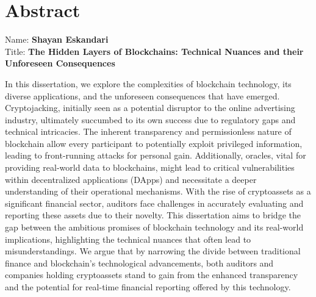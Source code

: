 
\chapter*{Abstract}

Name: 	\tab \textbf{Shayan Eskandari} \\
Title: 	\tab \textbf{The Hidden Layers of Blockchains: Technical Nuances and their Unforeseen Consequences}

In this dissertation, we explore the complexities of blockchain technology, its diverse applications, and the unforeseen consequences that have emerged. Cryptojacking, initially seen as a potential disruptor to the online advertising industry, ultimately succumbed to its own success due to regulatory gaps and technical intricacies. The inherent transparency and permissionless nature of blockchain allow every participant to potentially exploit privileged information, leading to front-running attacks for personal gain. Additionally, oracles, vital for providing real-world data to blockchains, might lead to critical vulnerabilities within decentralized applications (DApps) and necessitate a deeper understanding of their operational mechanisms. With the rise of cryptoassets as a significant financial sector, auditors face challenges in accurately evaluating and reporting these assets due to their novelty. This dissertation aims to bridge the gap between the ambitious promises of blockchain technology and its real-world implications, highlighting the technical nuances that often lead to misunderstandings. We argue that by narrowing the divide between traditional finance and blockchain's technological advancements, both auditors and companies holding cryptoassets stand to gain from the enhanced transparency and the potential for real-time financial reporting offered by this technology.










